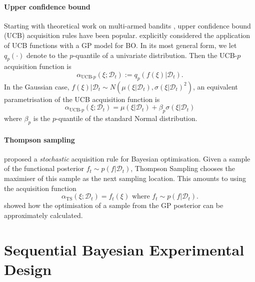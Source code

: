 \documentclass[a4paper, 10pt]{report}
\theoremstyle{plain}
\begin{document}
	\paragraph{Upper confidence bound}
	Starting with theoretical work on multi-armed bandits \citep{lai1985asymptotically}, upper confidence bound (UCB) acquisition rules have been popular.
	\citet{srinivas2009gaussian} explicitly considered the application of UCB functions with a GP model for BO.
	In its most general form, we let $q_p(\cdot)$ denote to the $p$-quantile of a univariate distribution. Then the UCB-$p$ acquisition function is
	\begin{equation}
	\alpha_{\text{UCB-}p}(\xi;\mathcal{D}_t) := q_p(f(\xi) | \mathcal{D}_t).
	\end{equation}
	In the Gaussian case, $f(\xi) | \mathcal{D}_t \sim N(\mu(\xi|\mathcal{D}_t),\sigma(\xi|\mathcal{D}_t)^2)$, an equivalent parametrisation of the UCB acquisition function is
	\begin{equation}
	\alpha_{\text{UCB-}p}(\xi;\mathcal{D}_t) = \mu(\xi|\mathcal{D}_t) + \beta_p \sigma(\xi|\mathcal{D}_t)
	\end{equation}
	where $\beta_p$ is the $p$-quantile of the standard Normal distribution.
	
	\paragraph{Thompson sampling} \citet{thompson1933likelihood} proposed a \emph{stochastic} acquisition rule for Bayesian optimisation.
	Given a sample of the functional posterior $f_t \sim p(f|\mathcal{D}_t)$, Thompson Sampling chooses the maximiser of this sample as the next sampling location. This amounts to using the acquisition function
	\begin{equation}
	\alpha_\text{TS}(\xi;\mathcal{D}_t) = f_t(\xi) \text{ where } f_t \sim p(f|\mathcal{D}_t).
	\end{equation}
	\citet{hernandez2014} showed how the optimisation of a sample from the GP posterior can be approximately calculated.
	
	
	
	
	\section{Sequential Bayesian Experimental Design}
	\label{sec:sequential}
	
\end{document}
